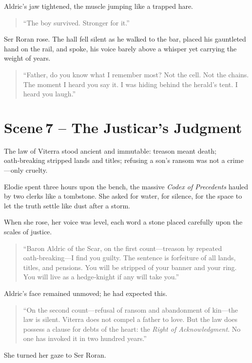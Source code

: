 \documentclass[11pt]{book}
\begin{document}
Aldric’s jaw tightened, the muscle jumping like a trapped hare.

\begin{quote}
``The boy survived. Stronger for it.''
\end{quote}

Ser Roran rose. The hall fell silent as he walked to the bar, placed his gauntleted hand on the rail, and spoke, his voice barely above a whisper yet carrying the weight of years.

\begin{quote}
``Father, do you know what I remember most? Not the cell. Not the chains. The moment I heard you say it. I was hiding behind the herald’s tent. I heard you laugh.''
\end{quote}

\section*{Scene 7 – The Justicar’s Judgment}
The law of Viterra stood ancient and immutable: treason meant death; oath‑breaking stripped lands and titles; refusing a son’s ransom was not a crime—only cruelty.

Elodie spent three hours upon the bench, the massive \textit{Codex of Precedents} hauled by two clerks like a tombstone. She asked for water, for silence, for the space to let the truth settle like dust after a storm.

When she rose, her voice was level, each word a stone placed carefully upon the scales of justice.

\begin{quote}
``Baron Aldric of the Scar, on the first count—treason by repeated oath‑breaking—I find you guilty. The sentence is forfeiture of all lands, titles, and pensions. You will be stripped of your banner and your ring. You will live as a hedge‑knight if any will take you.''
\end{quote}

Aldric’s face remained unmoved; he had expected this.

\begin{quote}
``On the second count—refusal of ransom and abandonment of kin—the law is silent. Viterra does not compel a father to love. But the law does possess a clause for debts of the heart: the \textit{Right of Acknowledgment}. No one has invoked it in two hundred years.''
\end{quote}

She turned her gaze to Ser Roran.
\end{document}
